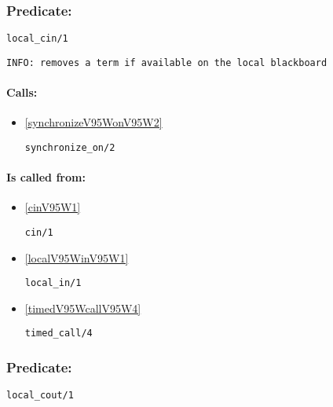 \subsubsection{Predicate:} \label{localV95WcinV95W1}

\begin{verbatim}
local_cin/1
\end{verbatim}

{\small \begin{verbatim}
INFO: removes a term if available on the local blackboard

\end{verbatim}}
\paragraph{Calls:} 
\begin{itemize}
\item \ref{synchronizeV95WonV95W2} 
\begin{verbatim}
synchronize_on/2
\end{verbatim}

\end{itemize}
\paragraph{Is called from:} 
\begin{itemize}
\item \ref{cinV95W1} 
\begin{verbatim}
cin/1
\end{verbatim}

\item \ref{localV95WinV95W1} 
\begin{verbatim}
local_in/1
\end{verbatim}

\item \ref{timedV95WcallV95W4} 
\begin{verbatim}
timed_call/4
\end{verbatim}

\end{itemize}

\subsubsection{Predicate:} \label{localV95WcoutV95W1}

\begin{verbatim}
local_cout/1
\end{verbatim}

